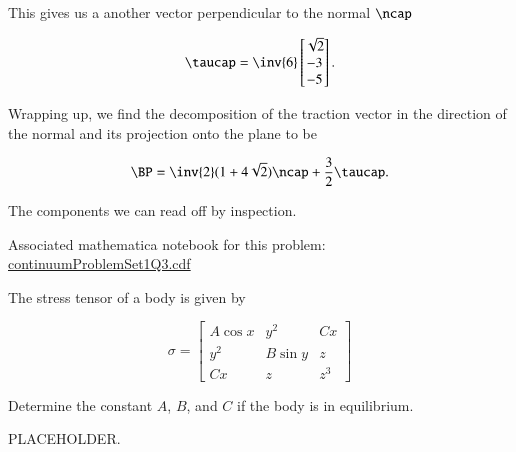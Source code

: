 \begin{Answer}[ref={problem:continuumProblemSet1:q3}]
This gives us a another vector perpendicular to the normal $\ncap$

\begin{equation}\label{eqn:continuumProblemSet1:490}
\taucap = 
\inv{6}
\begin{bmatrix}
\sqrt{2} \\
-3 \\
-5
\end{bmatrix}.
\end{equation}

Wrapping up, we find the decomposition of the traction vector in the direction of the normal and its projection onto the plane to be

\begin{equation}\label{eqn:continuumProblemSet1:510}
\BP 
= 
\inv{2}(1 + 4\sqrt{2}) \ncap
+
\frac{3}{2} \taucap.
\end{equation}

The components we can read off by inspection.

Associated mathematica notebook for this problem:
\href{https://raw.github.com/peeterjoot/physicsplay/master/notes/phy454/mathematica/continuumProblemSet1Q3.cdf}{continuumProblemSet1Q3.cdf}
\end{Answer}

\begin{Exercise}[title={Stress and equilibrium}, label={problem:continuumProblemSet1:q4}]
The stress tensor of a body is given by

\begin{equation}\label{eqn:continuumProblemSet1:90}
\sigma =
\begin{bmatrix}
A \cos x & y^2 & C x \\
y^2 & B \sin y & z \\
C x & z & z^3
\end{bmatrix}
\end{equation}

Determine the constant $A$, $B$, and $C$ if the body is in equilibrium.
\end{Exercise}

\begin{Exercise}[title={Compute stress tensors for some typical 3D forces}, label={problem:stressFIXME:p1}]

PLACEHOLDER.


\end{Exercise}

